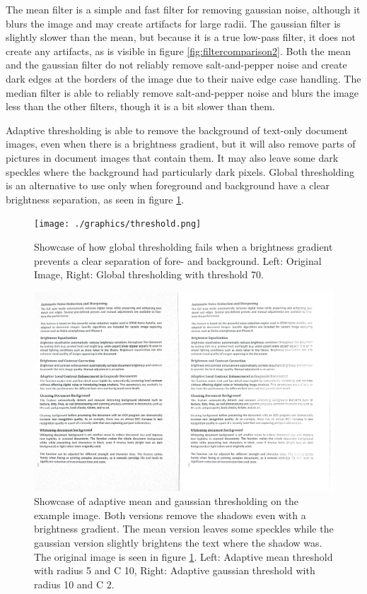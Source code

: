\documentclass[sigconf]{acmart}
\begin{document}
The mean filter is a simple and fast filter for removing gaussian noise, although it blurs the image and may create artifacts for large radii. The gaussian filter is slightly slower than the mean, but because it is a true low-pass filter, it does not create any artifacts, as is visible in figure \ref{fig:filtercomparison2}. Both the mean and the gaussian filter do not reliably remove salt-and-pepper noise and create dark edges at the borders of the image due to their naive edge case handling. The median filter is able to reliably remove salt-and-pepper noise and blurs the image less than the other filters, though it is a bit slower than them.

Adaptive thresholding is able to remove the background of text-only document images, even when there is a brightness gradient, but it will also remove parts of pictures in document images that contain them. It may also leave some dark speckles where the background had particularly dark pixels. Global thresholding is an alternative to use only when foreground and background have a clear brightness separation, as seen in figure \ref{fig:threshold}.

\begin{figure}
  \centering
  \texttt{[image: ./graphics/threshold.png]}
  \caption{Showcase of how global thresholding fails when a brightness gradient prevents a clear separation of fore- and background. Left: Original Image, Right: Global thresholding with threshold 70.}
  \label{fig:threshold}
\end{figure}

\begin{figure}
  \centering
  \includegraphics[width=\linewidth]{./graphics/threshold2.png}
  \caption{Showcase of adaptive mean and gaussian thresholding on the example image. Both versions remove the shadows even with a brightness gradient. The mean version leaves some speckles while the gaussian version slightly brightens the text where the shadow was. The original image is seen in figure \ref{fig:threshold}. Left: Adaptive mean threshold with radius 5 and C 10, Right: Adaptive gaussian threshold with radius 10 and C 2.}
  \label{fig:threshold2}
\end{figure}
\end{document}
